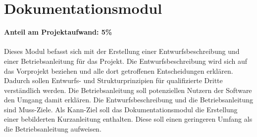 \section{Dokumentationsmodul}
\textbf{Anteil am Projektaufwand: 5\%}\\ \\
Dieses Modul befasst sich mit der Erstellung einer Entwurfsbeschreibung und einer Betriebsanleitung für das Projekt. Die Entwurfsbeschreibung wird sich auf das Vorprojekt beziehen und alle dort getroffenen Entscheidungen erklären. Dadurch sollen Entwurfs- und Strukturprinzipien für qualifizierte Dritte verständlich werden. Die Betriebsanleitung soll potenziellen Nutzern der Software den Umgang damit erklären. Die Entwurfsbeschreibung und die Betriebsanleitung sind Muss-Ziele. Als Kann-Ziel soll das Dokumentationsmodul die Erstellung einer bebilderten Kurzanleitung enthalten. Diese soll einen geringeren Umfang als die Betriebsanleitung aufweisen. 
